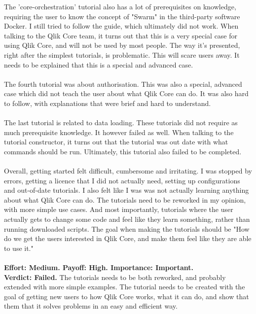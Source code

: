 \documentclass{cslthse-msc}
\begin{document}
    The 'core-orchestration' tutorial also has a lot of prerequisites on knowledge, requiring the user to know the concept of "Swarm" in the third-party software Docker. I still tried to follow the guide, which ultimately did not work. When talking to the Qlik Core team, it turns out that this is a very special case for using Qlik Core, and will not be used by most people. The way it's presented, right after the simplest tutorials, is problematic. This will scare users away. It needs to be explained that this is a special and advanced case. \\\\
    The fourth tutorial was about authorisation. This was also a special, advanced case which did not teach the user about what Qlik Core can do. It was also hard to follow, with explanations that were brief and hard to understand.\\\\
    The last tutorial is related to data loading. These tutorials did not require as much prerequisite knowledge. It however failed as well. When talking to the tutorial constructor, it turns out that the tutorial was out date with what commands should be run. Ultimately, this tutorial also failed to be completed.\\\\
    Overall, getting started felt difficult, cumbersome and irritating. I was stopped by errors, getting a licence that I did not actually need, setting up configurations and out-of-date tutorials. I also felt like I was was not actually learning anything about what Qlik Core can do. The tutorials need to be reworked in my opinion, with more simple use cases. And most importantly, tutorials where the user actually gets to change some code and feel like they learn something, rather than running downloaded scripts. The goal when making the tutorials should be "How do we get the users interested in Qlik Core, and make them feel like they are able to use it."\\\\
    \textbf{Effort: Medium. Payoff: High. Importance: Important.}\\
    \textbf{Verdict: Failed.} The tutorials needs to be both reworked, and probably extended with more simple examples. The tutorial needs to be created with the goal of getting new users to  how Qlik Core works, what it can do, and show that them that it solves problems in an easy and efficient way.
\end{document}
